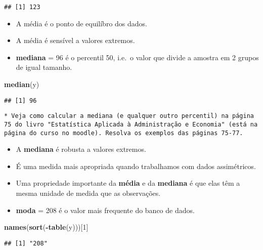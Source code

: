 \documentclass[]{article}
\newenvironment{Shaded}{\begin{snugshade}}{\end{snugshade}}
\newcommand{\KeywordTok}[1]{\textcolor[rgb]{0.13,0.29,0.53}{\textbf{#1}}}
\newcommand{\DecValTok}[1]{\textcolor[rgb]{0.00,0.00,0.81}{#1}}
\newcommand{\OperatorTok}[1]{\textcolor[rgb]{0.81,0.36,0.00}{\textbf{#1}}}
\newcommand{\NormalTok}[1]{#1}
\begin{document}
\begin{verbatim}
## [1] 123
\end{verbatim}

\begin{itemize}
\item
  A média é o ponto de equilíbro dos dados.
\item
  A média é sensível a valores extremos.
\item
  \textbf{mediana} = 96 é o percentil 50, i.e.~o valor que divide a
  amostra em 2 grupos de igual tamanho.
\end{itemize}

\begin{Shaded}
\begin{Highlighting}[]
\KeywordTok{median}\NormalTok{(y)}
\end{Highlighting}
\end{Shaded}

\begin{verbatim}
## [1] 96
\end{verbatim}

\begin{verbatim}
* Veja como calcular a mediana (e qualquer outro percentil) na página 75 do livro "Estatística Aplicada à Administração e Economia" (está na página do curso no moodle). Resolva os exemplos das páginas 75-77.
\end{verbatim}

\begin{itemize}
\item
  A \textbf{mediana} é robusta a valores extremos.
\item
  É uma medida mais apropriada quando trabalhamos com dados
  assimétricos.
\item
  Uma propriedade importante da \textbf{média} e da \textbf{mediana} é
  que elas têm a mesma unidade de medida que as observações.
\item
  \textbf{moda} = 208 é o valor mais frequente do banco de dados.
\end{itemize}

\begin{Shaded}
\begin{Highlighting}[]
\KeywordTok{names}\NormalTok{(}\KeywordTok{sort}\NormalTok{(}\OperatorTok{-}\KeywordTok{table}\NormalTok{(y)))[}\DecValTok{1}\NormalTok{]}
\end{Highlighting}
\end{Shaded}

\begin{verbatim}
## [1] "208"
\end{verbatim}
\end{document}
